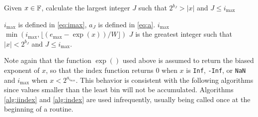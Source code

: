     \begin{samepage}
    \begin{alg}
      Given $x \in \mathbb{F}$, calculate the largest integer $J$ such that $2^{b_J} > |x|$ and $J \leq i_{\max}$
      \begin{algorithmic}[1]
        \Require $i_{\max}$ is defined in \eqref{eq:imax},
          $a_J$ is defined in \eqref{eq:a}.
           \State \Return $i_{\max}$ \EndIf
          \State \Return $\min(i_{\max}, \lfloor(e_{\max} - \exp(x))/W\rfloor)$
        \EndFunction
        \Ensure
          \Statex $J$ is the greatest integer such that $|x| < 2^{b_J}$ and $J \leq i_{\max}$.
      \end{algorithmic}
      \label{alg:index}
    \end{alg}
     \end{samepage}

    Note again that the function $\exp()$ used above is assumed to return the biased exponent of $x$, so that the index function returns 0 when $x$ is \texttt{Inf}, \texttt{-Inf}, or \texttt{NaN} and $i_{\max}$ when $x < 2^{a_{i_{\max}}}$.
    This behavior is consistent with the following algorithms since values smaller than the least bin will not be accumulated. Algorithms \ref{alg:iindex} and \ref{alg:index} are used infrequently, usually being called once at the beginning of a routine.
